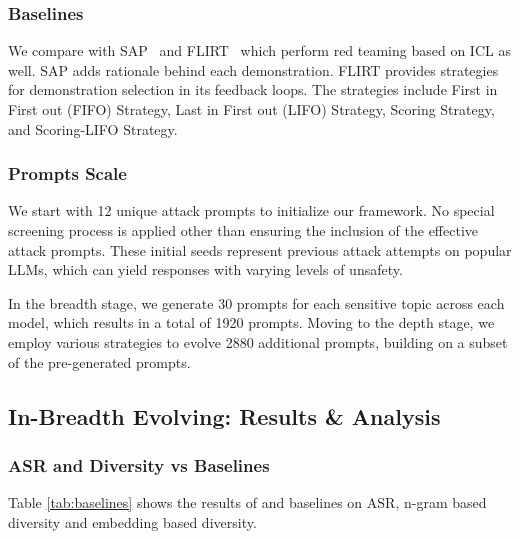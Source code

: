 \subsubsection{Baselines}
We compare \modelname with SAP~\cite{DBLP:conf/emnlp/DengWFDW023} and FLIRT~\cite{DBLP:journals/corr/abs-2308-04265} which perform red teaming based on ICL as well. SAP adds rationale behind each demonstration. FLIRT provides strategies for demonstration selection in its feedback loops. The strategies include First in First out (FIFO) Strategy, Last in First out (LIFO) Strategy, Scoring Strategy, and Scoring-LIFO Strategy.

\subsubsection{Prompts Scale} 
We start with 12 unique attack prompts to initialize our framework. No special screening process is applied other than ensuring the inclusion of the effective attack prompts. 
These initial seeds represent previous attack attempts on popular LLMs, which can yield responses with varying levels of unsafety.

In the breadth stage, we generate 30 prompts for each sensitive topic across each model, which results in a total of 1920 prompts. Moving to the depth stage, we employ various strategies to evolve 2880 additional prompts, building on a subset of the pre-generated prompts. 







\subsection{In-Breadth Evolving: Results \& Analysis}
\subsubsection{ASR and Diversity vs Baselines}
Table \ref{tab:baselines} shows the results of \modelname and baselines on ASR, n-gram based diversity and embedding based diversity.

